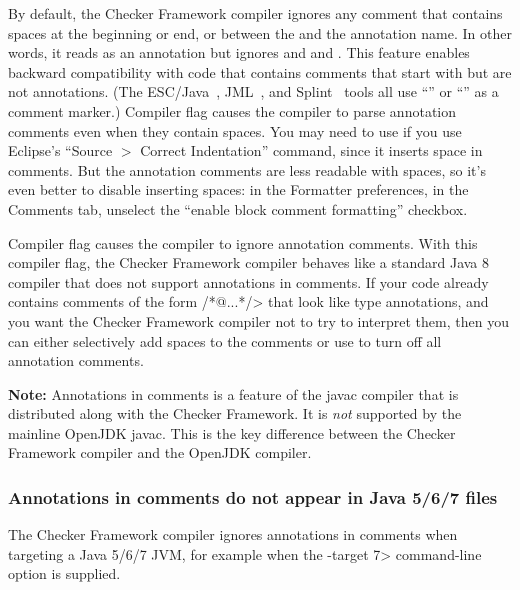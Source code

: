 \begin{sloppypar}
By default, the Checker Framework compiler ignores any comment that contains spaces at the
beginning or end, or between the  and the annotation name.
In other words, it reads  as an annotation but ignores
 and  and .
This
feature enables backward compatibility with code that contains comments
that start with  but are not annotations.  (The
ESC/Java~\cite{FlanaganLLNSS02}, JML~\cite{LeavensBR2006:JML}, and
Splint~\cite{Evans96} tools all use ``'' or ``'' as a
comment marker.)
Compiler flag
 causes the compiler to parse annotation comments
even when they contain spaces.  You may need to use
 if you use Eclipse's ``Source $>$ Correct
Indentation'' command, since it inserts space in comments.  But the
annotation comments are less readable with spaces, so it's even better to disable
inserting spaces:  in the Formatter preferences, in the Comments tab,
unselect the ``enable block comment formatting'' checkbox.
\end{sloppypar}

Compiler flag  causes the compiler
to ignore annotation comments.  With this compiler flag, the
Checker Framework compiler behaves like a standard Java 8 compiler that does
not support annotations in comments.  If your code already contains
comments of the form \</*@...*/> that look like type annotations, and
you want the Checker Framework compiler not to try to interpret them,
then you can either selectively add spaces to the comments or use
 to turn off all annotation
comments.

\textbf{Note:} Annotations in comments is a feature of the javac compiler
that is
distributed along with the Checker Framework.  It is \emph{not}
supported by the mainline OpenJDK javac.  This is the key
difference between the Checker Framework compiler and the OpenJDK compiler.


\subsubsection{Annotations in comments do not appear in Java 5/6/7  files\label{annotations-in-java7-class-files}}

The Checker Framework compiler ignores annotations in comments when
targeting a Java 5/6/7 JVM, for example when the \<-target 7> command-line
option is supplied.


